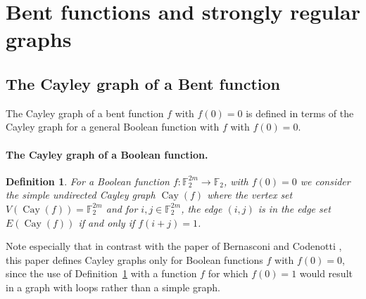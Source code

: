 \documentclass[12pt,a4paper]{article}
\newcommand{\mb}[1]{\mathbb{#1}}
\newcommand{\F}{\mb{F}}
\newcommand{\To}{\rightarrow}
\newcommand{\Cay}[1]{\operatorname{Cay}\left(#1\right)}
\newtheorem{Definition}{Definition}
\begin{document}
%
%

\section{Bent functions and strongly regular graphs}
\label{sec-Bent-graphs}
\subsection{The Cayley graph of a Bent function}

The Cayley graph of a bent function $f$ with $f(0)=0$ is defined
in terms of the Cayley graph for a general Boolean function with $f$ with $f(0)=0$.
\paragraph*{The Cayley graph of a Boolean function.}
\begin{Definition}
\label{def-Cayley-graph}
For a Boolean function $f : \F_2^{2 m} \To \F_2$, with $f(0)=0$ we consider the simple undirected
\emph{Cayley graph} $\Cay{f}$  \cite[3.1]{BerC99}
where the vertex set $V(\Cay{f}) = \F_2^{2 m}$ and for $i,j \in \F_2^{2 m}$, the edge $(i,j)$ is in
the edge set $E(\Cay{f})$ if and only if $f(i+j)=1$.
\end{Definition}
Note especially that in contrast with the paper of Bernasconi and Codenotti \cite{BerC99},
this paper defines Cayley graphs only for Boolean functions $f$ with $f(0)=0$,
since the use of Definition~\ref{def-Cayley-graph} with a function $f$ for which $f(0)=1$ would
result in a graph with loops rather than a simple graph.

\end{document}
